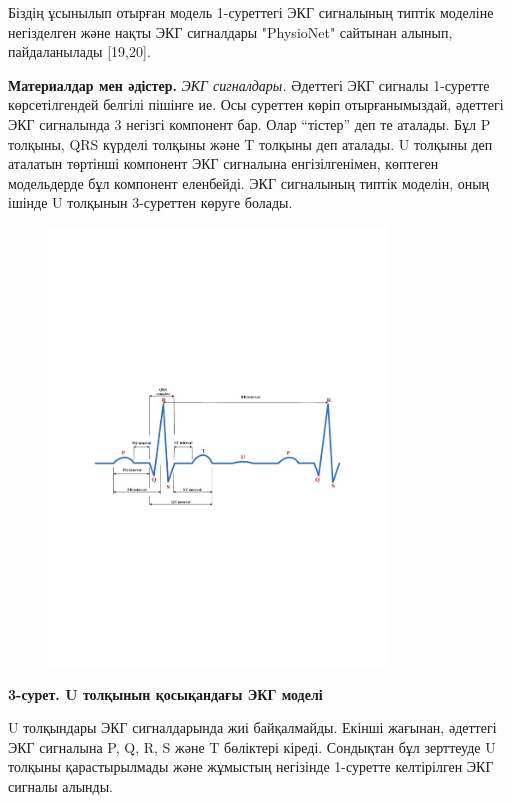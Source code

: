 {Біздің ұсынылып отырған модель 1-суреттегі ЭКГ сигналының типтік
моделіне негізделген және нақты ЭКГ сигналдары "PhysioNet" сайтынан
алынып, пайдаланылады {[}19,20{]}.

{\bfseries Материалдар мен әдістер.} \emph{ЭКГ сигналдары.} Әдеттегі ЭКГ
сигналы 1-суретте көрсетілгендей белгілі пішінге ие. Осы суреттен көріп
отырғанымыздай, әдеттегі ЭКГ сигналында 3 негізгі компонент бар. Олар
``тістер'' деп те аталады. Бұл P толқыны, QRS күрделі толқыны және T
толқыны деп аталады. U толқыны деп аталатын төртінші компонент ЭКГ
сигналына енгізілгенімен, көптеген модельдерде бұл компонент еленбейді.
ЭКГ сигналының типтік моделін, оның ішінде U толқынын 3-суреттен көруге
болады.

\begin{figure}[H]
	\centering
	\includegraphics[width=0.8\textwidth]{media/ict/image42}
	\caption*{}
\end{figure}


{\bfseries 3-сурет. U толқынын қосықандағы ЭКГ моделі}

U толқындары ЭКГ сигналдарында жиі байқалмайды. Екінші жағынан, әдеттегі
ЭКГ сигналына P, Q, R, S және T бөліктері кіреді. Сондықтан бұл
зерттеуде U толқыны қарастырылмады және жұмыстың негізінде 1-суретте
келтірілген ЭКГ сигналы алынды.

}
